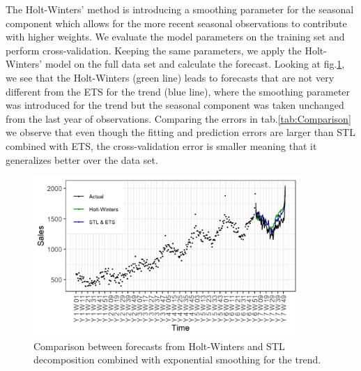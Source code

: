 \documentclass[12pt, letterpaper]{article}\usepackage[]{graphicx}\usepackage[]{color}
\begin{document}
The Holt-Winters' method is introducing a smoothing parameter for the seasonal component which allows for the more recent seasonal observations to contribute with higher weights. We evaluate the model parameters on the training set and perform cross-validation. Keeping the same parameters, we apply the Holt-Winters' model on the full data set and calculate the forecast. Looking at fig.\ref{fig:hw_stl}, we see that the Holt-Winters (green line) leads to forecasts that are not very different from the ETS for the trend (blue line), where the smoothing parameter was introduced for the trend but the seasonal component was taken unchanged from the last year of observations. Comparing the errors in tab.\ref{tab:Comparison} we observe that even though the fitting and prediction errors are larger than STL combined with ETS, the cross-validation error is smaller meaning that it generalizes better over the data set.
\begin{figure}[h!]
\centering
\includegraphics[width = 0.9\textwidth]{"figures/hw_stl.png"}
\caption{Comparison between forecasts from Holt-Winters and STL decomposition combined with exponential smoothing for the trend.}
\label{fig:hw_stl}
\end{figure}
\end{document}
